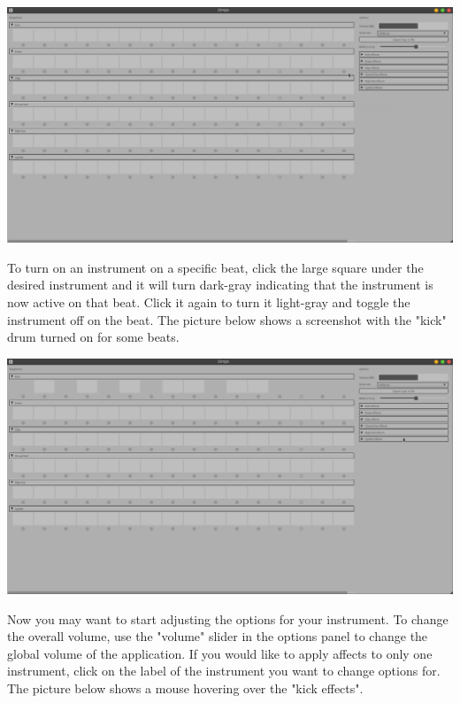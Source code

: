 \documentclass[11pt]{article}
\begin{document}
\begin{center}
\includegraphics[width=15cm]{./default.png}
\end{center}

To turn on an instrument on a specific beat, click the large square
under the desired instrument and it will turn dark-gray indicating
that the instrument is now active on that beat. Click it again to turn
it light-gray and toggle the instrument off on the beat. The picture
below shows a screenshot with the "kick" drum turned on for some beats.

\begin{center}
\includegraphics[width=15cm]{./no2.png}
\end{center}

Now you may want to start adjusting the options for your instrument. To
change the overall volume, use the "volume" slider in the options panel to
change the global volume of the application. If you would like to apply affects
to only one instrument, click on the label of the instrument you want to change
options for. The picture below shows a mouse hovering over the "kick effects".
\end{document}
